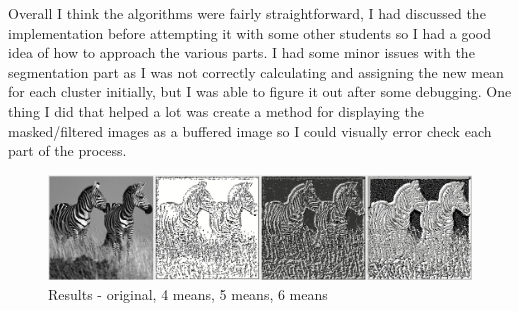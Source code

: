 \documentclass[12pt]{article}
\begin{document}
Overall I think the algorithms were fairly straightforward, I had discussed the implementation before attempting it with some other students so I had a good idea of how to approach the various parts. I had some minor issues with the segmentation part as I was not correctly calculating and assigning the new mean for each cluster initially, but I was able to figure it out after some debugging. One thing I did that helped a lot was create a method for displaying the masked/filtered images as a buffered image so I could visually error check each part of the process. \\

\begin{figure}[htb]
\includegraphics[scale=.5]{result.PNG}
\caption{Results - original, 4 means, 5 means, 6 means}
\end{figure}
\end{document}
